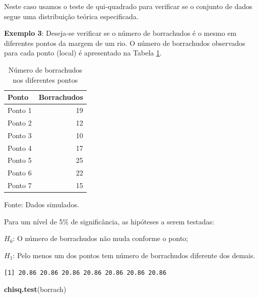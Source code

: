\documentclass[12pt,brazil,oneside]{book}
\newenvironment{Shaded}{\begin{snugshade}}{\end{snugshade}}
\newcommand{\DecValTok}[1]{\textcolor[rgb]{0.00,0.00,0.81}{#1}}
\newcommand{\KeywordTok}[1]{\textcolor[rgb]{0.13,0.29,0.53}{\textbf{#1}}}
\newcommand{\NormalTok}[1]{#1}
\newcommand{\OperatorTok}[1]{\textcolor[rgb]{0.81,0.36,0.00}{\textbf{#1}}}
\begin{document}
Neste caso usamos o teste de qui-quadrado para verificar se o conjunto de dados segue uma distribuição teórica especificada.

\textbf{Exemplo 3}: Deseja-se verificar se o número de borrachudos é o mesmo em diferentes pontos da margem de um rio. O número de borrachudos observados para cada ponto (local) é apresentado na Tabela \ref{tab:borrach}.

\begin{table}[t]

\caption{\label{tab:borrach}Número de borrachudos nos diferentes pontos}
\centering
\begin{tabular}{l|r}
\hline
Ponto & Borrachudos\\
\hline
Ponto 1 & 19\\
\hline
Ponto 2 & 12\\
\hline
Ponto 3 & 10\\
\hline
Ponto 4 & 17\\
\hline
Ponto 5 & 25\\
\hline
Ponto 6 & 22\\
\hline
Ponto 7 & 15\\
\hline
\end{tabular}
\end{table}

Fonte: Dados simulados.

Para um nível de 5\% de significância, as hipóteses a serem testadas:

\(H_0\): O número de borrachudos não muda conforme o ponto;

\(H_1\): Pelo menos um dos pontos tem número de borrachudos diferente dos demais.

\begin{Shaded}
\end{Shaded}

\begin{verbatim}
[1] 20.86 20.86 20.86 20.86 20.86 20.86 20.86
\end{verbatim}

\begin{Shaded}
\begin{Highlighting}[]
\KeywordTok{chisq.test}\NormalTok{(borrach)}
\end{Highlighting}
\end{Shaded}
\end{document}
